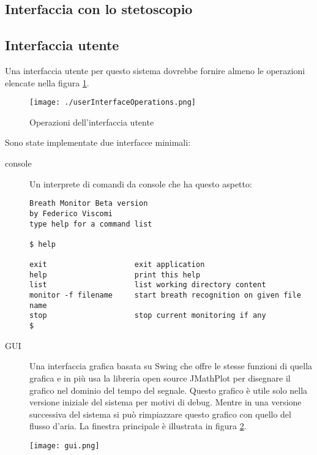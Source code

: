 \subsection{Interfaccia con lo stetoscopio}




\subsection{Interfaccia utente}



Una interfaccia utente per questo sistema dovrebbe fornire almeno le operazioni elencate nella figura \ref{interfacciautente}.

  \begin{figure}
  \centering
  \texttt{[image: ./userInterfaceOperations.png]}
  \caption{Operazioni dell'interfaccia utente}
  \label{interfacciautente}
  \end{figure}

Sono state implementate due interfacce minimali: 
\begin{description}
  \item[console]
    Un interprete di comandi da console che ha questo aspetto:
    \begin{verbatim}
Breath Monitor Beta version
by Federico Viscomi
type help for a command list

$ help

exit                	exit application             
help                	print this help               
list                	list working directory content
monitor -f filename 	start breath recognition on given file name
stop                	stop current monitoring if any
$ 
    \end{verbatim}

  \item[GUI]
    Una interfaccia grafica basata su Swing \cite{Swing} che offre le stesse funzioni di quella grafica e in pi\`u usa la libreria open source JMathPlot \cite{jmathplot} per disegnare il grafico nel dominio del tempo del segnale. Questo grafico \`e utile solo nella versione iniziale del sistema per motivi di debug. Mentre in una versione successiva del sistema si pu\`o rimpiazzare questo grafico con quello del flusso d'aria. La finestra principale \`e illustrata in figura \ref{finestraprincipale}.
\end{description}

\begin{figure}
 \centering
 \texttt{[image: gui.png]}
  \label{finestraprincipale}
\end{figure}



